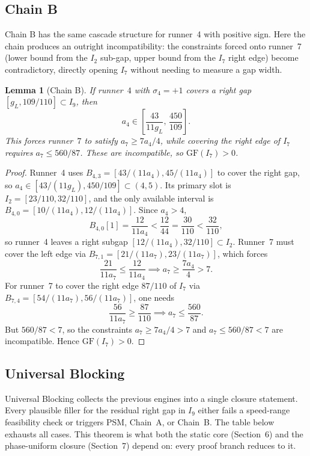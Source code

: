 \documentclass[12pt,a4paper]{amsart}
\newtheorem{lemma}[theorem]{Lemma}
\theoremstyle{definition}
\theoremstyle{remark}
\newcommand{\GF}{\mathrm{GF}}
\begin{document}
\subsection{Chain B}

Chain B has the same cascade structure for runner~4 with positive sign. Here the chain
produces an outright incompatibility: the constraints forced onto runner~7 (lower bound
from the $I_2$ sub-gap, upper bound from the $I_7$ right edge) become contradictory,
directly opening $I_7$ without needing to measure a gap width.

\begin{lemma}[Chain B]\label{lem:chainB}
If runner~$4$ with $\sigma_4=+1$ covers a right gap $[g_L,109/110]\subset I_9$, then
\[
  a_4 \in \left[\frac{43}{11g_L},\,\frac{450}{109}\right].
\]
This forces runner~$7$ to satisfy $a_7\ge 7a_4/4$, while covering the right edge of $I_7$
requires $a_7\le 560/87$. These are incompatible, so $\GF(I_7)>0$.
\end{lemma}

\begin{proof}
Runner~4 uses $B_{4,3}=[43/(11a_4),45/(11a_4)]$ to cover the right gap, so
$a_4\in[43/(11g_L),450/109]\subset(4,5)$. Its primary slot is $I_2=[23/110,32/110]$, and
the only available interval is $B_{4,0}=[10/(11a_4),12/(11a_4)]$. Since $a_4>4$,
\[
  B_{4,0}[1] = \frac{12}{11a_4} < \frac{12}{44} = \frac{30}{110} < \frac{32}{110},
\]
so runner~4 leaves a right subgap $[12/(11a_4),32/110]\subset I_2$. Runner~7 must cover
the left edge via $B_{7,1}=[21/(11a_7),23/(11a_7)]$, which forces
\[
  \frac{21}{11a_7} \le \frac{12}{11a_4} \implies a_7 \ge \frac{7a_4}{4} > 7.
\]
For runner~7 to cover the right edge $87/110$ of $I_7$
via $B_{7,4}=[54/(11a_7),56/(11a_7)]$, one needs
\[
  \frac{56}{11a_7} \ge \frac{87}{110} \implies a_7 \le \frac{560}{87}.
\]
But $560/87<7$, so the constraints $a_7\ge 7a_4/4>7$
and $a_7\le 560/87<7$ are incompatible. Hence $\GF(I_7)>0$.
\end{proof}

\subsection{Universal Blocking}

Universal Blocking collects the previous engines into a single closure statement. Every
plausible filler for the residual right gap in $I_9$ either fails a speed-range feasibility
check or triggers PSM, Chain~A, or Chain~B. The table below exhausts all cases. This
theorem is what both the static core (Section~6) and the phase-uniform closure (Section~7)
depend on: every proof branch reduces to it.
\end{document}
